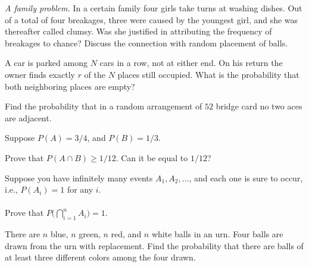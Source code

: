 \begin{problem}[Handout 2, \# 14]
  \emph{A family problem.} In a certain family four girls take turns at
  washing dishes. Out of a total of four breakages, three were caused by
  the youngest girl, and she was thereafter called clumsy. Was she
  justified in attributing the frequency of breakages to chance? Discuss
  the connection with random placement of balls.
\end{problem}
\begin{solution}

\end{solution}
\newpage

\begin{problem}[Handout 2, \# 15]
  A car is parked among \(N\) cars in a row, not at either end. On his
  return the owner finds exactly \(r\) of the \(N\) places still
  occupied. What is the probability that both neighboring places are empty?
\end{problem}
\begin{solution}

\end{solution}
\newpage

\begin{problem}[Handout 2, \# 16]
  Find the probability that in a random arrangement of \(52\) bridge card
  no two aces are adjacent.
\end{problem}
\begin{solution}

\end{solution}
\newpage

\begin{problem}[Handout 2, \# 17]
  Suppose \(P(A)=3/4\), and \(P(B)=1/3\).

  Prove that \(P(A\cap B)\geq 1/12\). Can it be equal to \(1/12\)?
\end{problem}
\begin{solution}

\end{solution}
\newpage

\begin{problem}[Handout 2, \# 18]
  Suppose you have infinitely many events \(A_1,A_2,\dotsc\), and each one
  is sure to occur, i.e., \(P(A_i)=1\) for any \(i\).
  \\\\
  Prove that \(P\bigl(\bigcap_{i=1}^n A_i\bigr)=1\).
\end{problem}
\begin{solution}

\end{solution}
\newpage

\begin{problem}[Handout 2, \# 19]
  There are \(n\) blue, \(n\) green, \(n\) red, and \(n\) white balls in an
  urn. Four balls are drawn from the urn with replacement. Find the
  probability that there are balls of at least three different colors among
  the four drawn.
\end{problem}
\begin{solution}

\end{solution}

